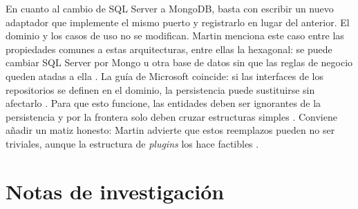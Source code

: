 En cuanto al cambio de SQL Server a MongoDB, basta con escribir un nuevo adaptador que implemente el mismo puerto y registrarlo en lugar del anterior. El dominio y los casos de uso no se modifican. Martin menciona este caso entre las propiedades comunes a estas arquitecturas, entre ellas la hexagonal: se puede cambiar SQL Server por Mongo u otra base de datos sin que las reglas de negocio queden atadas a ella . La guía de Microsoft coincide: si las interfaces de los repositorios se definen en el dominio, la persistencia puede sustituirse sin afectarlo \citep[pp.~145--146]{delatorre2010}. Para que esto funcione, las entidades deben ser ignorantes de la persistencia y por la frontera solo deben cruzar estructuras simples \parencites[p.~207]{martin2017}[p.~55]{delatorre2010}. Conviene añadir un matiz honesto: Martin advierte que estos reemplazos pueden no ser triviales, aunque la estructura de \emph{plugins} los hace factibles .



\section*{Notas de investigación}

